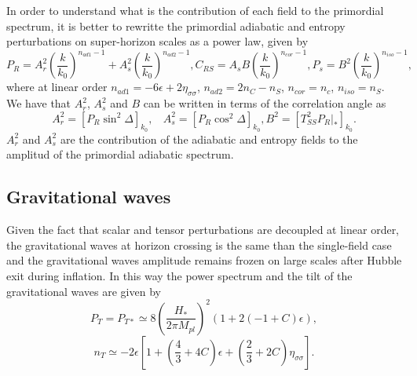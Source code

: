\documentclass[amssymb,twocolumn,prd,nofootinbib,showpacs]{revtex4-1}
\begin{document}
In order to understand what is the contribution of each field to the primordial spectrum, it is better to rewritte the primordial adiabatic and entropy perturbations on super-horizon scales as a power law, given by
\begin{subequations}\label{PswAs}
\begin{equation}\label{PrAs}
P_R=A_r^2\left(\frac{k}{k_0}\right)^{n_{ad1}-1}+A_s^2\left(\frac{k}{k_0}\right)^{n_{ad2}-1},
\end{equation}
\begin{equation}\label{PrCrs}
C_{RS}=A_sB\left(\frac{k}{k_0}\right)^{n_{cor}-1},
\end{equation}
\begin{equation}\label{PsAs}
P_s=B^2\left(\frac{k}{k_0}\right)^{n_{iso}-1},
\end{equation}
\end{subequations}
where at linear order $n_{ad1}=-6\epsilon+2\eta_{\sigma\sigma}$, $n_{ad2}=2n_C-n_S$, $n_{cor}=n_c$, $n_{iso}=n_S$. We have that $A_r^2$, $A_s^2$ and $B$ can be written in terms of the correlation angle as
\begin{subequations}
\label{RelAs}
\begin{equation}
A_r^2=[P_R\sin^2\Delta]_{k_0}, \ \ \ \ A_s^2=[P_R\cos^2\Delta]_{k_0},
\end{equation}
\begin{equation}
B^2=[T_{SS}^2 P_R|_*]_{k_0}.
\end{equation}
\end{subequations}
$A_r^2$ and $A_s^2$ are the contribution of the adiabatic and entropy fields to the amplitud of the primordial adiabatic spectrum. 
\subsection{Gravitational waves}

Given the fact that scalar and tensor perturbations are decoupled at linear order, the gravitational waves at horizon crossing is the same than the single-field case and the gravitational waves amplitude remains frozen on large scales after Hubble exit during inflation. In this way the power spectrum and the tilt of the gravitational waves are given by
\begin{equation}
P_T=P_{T*}\simeq 8 \left(\frac{H_*}{2\pi M_{pl}}\right)^2(1+2(-1+C)\epsilon),
\end{equation}
\begin{equation}\label{tiltsnt}
n_T\simeq -2\epsilon\left[1+\left(\frac{4}{3}+4C\right)\epsilon+\left(\frac{2}{3}+2C\right)\eta_{\sigma\sigma}\right].
\end{equation}
\end{document}
